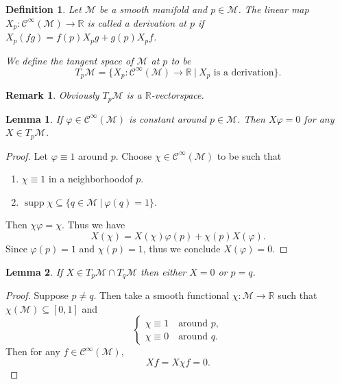\documentclass[10pt]{article}
\newtheorem{definition}{Definition}[section]
\newtheorem{lemma}{Lemma}[section]
\newtheorem{remark}{Remark}[section]
\DeclareMathOperator{\supp}{supp}
\newcommand{\R}[0]{\mathbb{R}}
\newcommand{\M}[0]{\mathcal{M}}
\newcommand{\cinf}[0]{\mathcal{C}^\infty}
\newcommand{\sep}[0]{\:|\:}
\begin{document}
\begin{definition}
Let $\mathcal{M}$ be a smooth manifold and $p\in\mathcal{M}$. The linear map $X_p:\mathcal{C}^\infty(\mathcal{M})\to\R$ is called a derivation at $p$ if 
$X_p(fg) = f(p)X_pg+g(p)X_pf$.
\par We define the tangent space of $\mathcal{M}$ at $p$ to be 
\begin{equation*}
T_p\mathcal{M} = \{X_p:\mathcal{C}^\infty(\mathcal{M})\to \R\sep \text{$X_p$ is a derivation}\}.
\end{equation*}
\end{definition}

\begin{remark}
  Obviously $T_p\mathcal{M}$ is a $\R$-vectorspace.
\end{remark}



\begin{lemma}
  If $\varphi\in\mathcal{C}^\infty(\mathcal{M})$ is constant around $p\in\mathcal{M}$. Then $X\varphi = 0$ for any $X\in T_p\M$. 
\end{lemma}
\begin{proof}
Let $\varphi\equiv 1$ around $p$. Choose $\chi\in\cinf(\M)$ to be such that 
\begin{enumerate}
  \item $\chi\equiv1$ in a neighborhoodof $p$.
  \item $\supp\chi\subseteq\{q\in\M\sep\varphi(q)=1\}$.
\end{enumerate}
Then $\chi\varphi = \chi$. Thus we have 
\begin{equation*}
  X(\chi) = X(\chi)\varphi(p) + \chi(p)X(\varphi).
\end{equation*}
Since $\varphi(p) = 1$ and $\chi(p)=1$, thus we conclude $X(\varphi) = 0$. 
\end{proof}

\begin{lemma}
  If $X\in T_p\M\cap T_q\M$ then either $X=0$ or $p=q$. 
\end{lemma}

\begin{proof}
  Suppose $p\not=q$. Then take a smooth functional $\chi:\M\to\R$ such that $\chi(\M)\subseteq[0,1]$ and 
  \begin{equation*}
    \begin{cases}
      \chi \equiv 1 \quad \text{around $p$},\\
      \chi \equiv 0 \quad \text{around $q$}.
    \end{cases}
  \end{equation*}
  Then for any $f\in\cinf(\M)$,
  \begin{equation*}
    Xf = X\chi f = 0.
  \end{equation*}
\end{proof}
\end{document}
